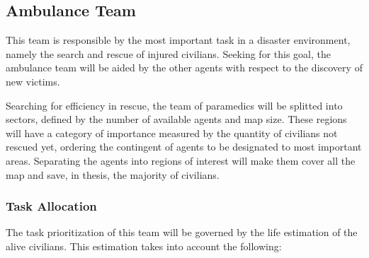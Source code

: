 \subsection{Ambulance Team}
\label{sec:ambulance}

This team is responsible by the most important task in a disaster environment, namely the search and rescue of injured civilians. Seeking for this goal, the ambulance team will be aided by the other agents with respect to the discovery of new victims.

Searching for efficiency in rescue, the team of paramedics will be splitted into sectors, defined by the number of available agents and map size. These regions will have a category of importance measured by the quantity of civilians not rescued yet, ordering the contingent of agents to be designated to most important areas. Separating the agents into regions of interest will make them cover all the map and save, in thesis, the majority of civilians.

\subsubsection{Task Allocation}

The task prioritization of this team will be governed by the life estimation of the alive civilians. This estimation takes into account the following:

